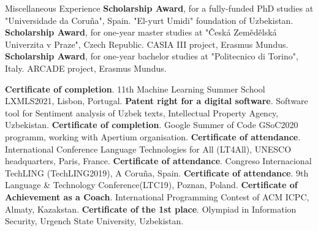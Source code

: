 \begin{rubric}{\faAward Miscellaneous Experience}
\entry*[2018-2021] \textbf{Scholarship Award}, for a fully-funded PhD studies at "Universidade da Coruña", Spain. "El-yurt Umidi" foundation of Uzbekistan.
%
\entry*[2015-2016] \textbf{Scholarship Award}, for one-year master studies at "Česká Zemědělská Univerzita v Praze", Czech Republic. CASIA III project, Erasmus Mundus.
%
\entry*[2012-2013] \textbf{Scholarship Award}, for one-year bachelor studies at "Politecnico di Torino", Italy. ARCADE project, Erasmus Mundus.

\entry*[2021] \textbf{Certificate of completion}. 11th Machine Learning Summer School LXMLS2021, Lisbon, Portugal.
\entry*[2021] \textbf{Patent right for a digital software}. Software tool for Sentiment analysis of Uzbek texts, Intellectual Property Agency, Uzbekistan.
\entry*[2020] \textbf{Certificate of completion}. Google Summer of Code GSoC2020 programm, working with Apertium organisation.
\entry*[2019] \textbf{Certificate of attendance}. International Conference Language Technologies for All (LT4All), UNESCO headquarters, Paris, France.
\entry*[2019] \textbf{Certificate of attendance}. Congreso Internacional TechLING (TechLING2019), A Coruña, Spain.
\entry*[2019] \textbf{Certificate of attendance}. 9th Language \& Technology Conference(LTC19), Poznan, Poland.
\entry*[2017] \textbf{Certificate of Achievement as a Coach}. International Programming Contest of ACM ICPC, Almaty, Kazakstan.
\entry*[2014] \textbf{Certificate of the 1st place}. Olympiad in Information Security, Urgench State University, Uzbekistan.




\end{rubric}